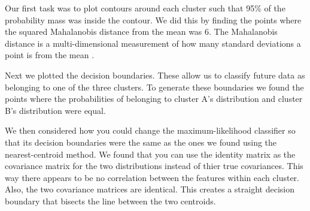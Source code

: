 \documentclass[11pt, a4paper]{article}
\begin{document}
Our first task was to plot contours around each cluster such that 95\% of the probability mass was inside the contour. We did this by finding the points where the squared Mahalanobis distance from the mean was 6. The Mahalanobis distance is a multi-dimensional measurement of how many standard deviations a point is from the mean \cite{mal_wiki}.

Next we plotted the decision boundaries. These allow us to classify future data as belonging to one of the three clusters. To generate these boundaries we found the points where the probabilities of belonging to cluster A's distribution and cluster B's distribution were equal.


We then considered how you could change the maximum-likelihood classifier so that its decision boundaries were the same as the ones we found using the nearest-centroid method. We found that you can use the identity matrix as the covariance matrix for the two distributions instead of thier true covariances. This way there appears to be no correlation between the features within each cluster. Also, the two covariance matrices are identical. This creates a straight decision boundary that bisects the line between the two centroids.

\end{document}
